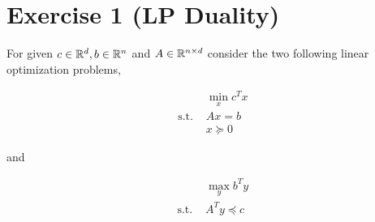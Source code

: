 \documentclass[a4paper, 11pt]{report}
\begin{document}

\maketitle

\section*{Exercise 1 (LP Duality)}

For given $c \in \mathbb{R}^{d}, b \in \mathbb{R}^{n}$ and $A \in \mathbb{R}^{n \times d}$ consider the two following linear optimization problems,

\begin{equation}
\tag{P}
    \begin{aligned}
    & \min_{x}
    c^{T} x \\
    \text{ s.t. }
    & Ax = b \\
    & x \succeq 0
    \end{aligned}
\label{eq:pb-P}
\end{equation}

\noindent and

\begin{equation}
\tag{D}
    \begin{aligned}
    & \max_{y}
    b^{T} y \\
    \text{ s.t. }
    & A^{T} y \preceq c
    \end{aligned}
\label{eq:pb-D}
\end{equation}
\end{document}
